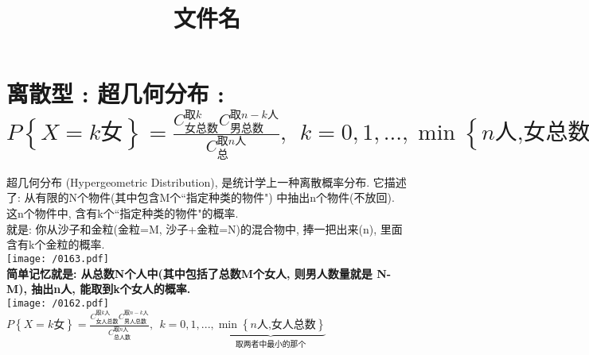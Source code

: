 \documentclass[UTF8]{ctexart}
\title{文件名}
\begin{document}
	\tableofcontents %
	\date{} %
	\maketitle  %
	
	
	
	\section{离散型 : 超几何分布 : \\ $\boxed{
			P\left\{ X=k\text{女} \right\} =\frac{C_{\text{女总数}}^{\text{取}k}C_{\text{男总数}}^{\text{取}n-k\text{人}}}{C_{\text{总}}^{\text{取}n\text{人}}},\ \ k=0,1,...,\min \left\{ n\text{人,女总数} \right\} 
			}$}
	
	超几何分布  (Hypergeometric Distribution), 是统计学上一种离散概率分布. 它描述了: 从有限的N个物件(其中包含M个``指定种类的物件") 中抽出n个物件(不放回). 这n个物件中, 含有k个``指定种类的物件"的概率. \\	
	
	就是: 你从沙子和金粒(金粒=M, 沙子+金粒=N)的混合物中, 捧一把出来(n), 里面含有k个金粒的概率. \\
	
	\texttt{[image: /0163.pdf]} \\
	
	\textbf{简单记忆就是: 从总数N个人中(其中包括了总数M个女人, 则男人数量就是 N-M), 抽出n人, 能取到k个女人的概率.} \\
	
	\texttt{[image: /0162.pdf]} \\
	
	$\boxed{
	P\left\{ X=k\text{女} \right\} =\frac{C_{\text{女人总数}}^{\text{取}k\text{人}}C_{\text{男人总数}}^{\text{取}n-k\text{人}}}{C_{\text{总人数}}^{\text{取}n\text{人}}},\ \ k=0,1,...,\underset{\text{取两者中最小的那个}}{\underbrace{\min \left\{ n\text{人,女人总数} \right\} }}
	}$ \\
	\vspace{1em} 
	
\end{document}

